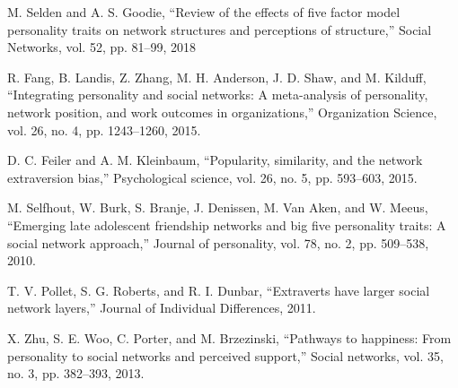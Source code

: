 \documentclass[runningheads]{llncs}
\begin{document}
\begin{thebibliography}{8}

M. Selden and A. S. Goodie, “Review of the effects of five factor model personality traits on network structures and perceptions of structure,” Social Networks, vol. 52, pp. 81–99, 2018

R. Fang, B. Landis, Z. Zhang, M. H. Anderson, J. D. Shaw, and M. Kilduff, “Integrating personality and social networks: A meta-analysis of personality, network position, and work outcomes in organizations,” Organization Science, vol. 26, no. 4, pp. 1243–1260, 2015.

D. C. Feiler and A. M. Kleinbaum, “Popularity, similarity, and the
network extraversion bias,” Psychological science, vol. 26, no. 5, pp.
593–603, 2015.

M. Selfhout, W. Burk, S. Branje, J. Denissen, M. Van Aken, and
W. Meeus, “Emerging late adolescent friendship networks and big five
personality traits: A social network approach,” Journal of personality,
vol. 78, no. 2, pp. 509–538, 2010.

T. V. Pollet, S. G. Roberts, and R. I. Dunbar, “Extraverts have larger
social network layers,” Journal of Individual Differences, 2011.

X. Zhu, S. E. Woo, C. Porter, and M. Brzezinski, “Pathways to
happiness: From personality to social networks and perceived support,”
Social networks, vol. 35, no. 3, pp. 382–393, 2013.


\end{thebibliography}
\end{document}
